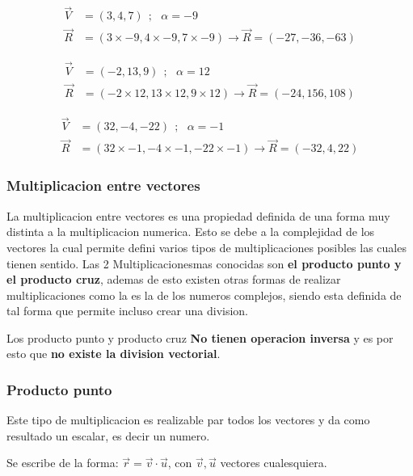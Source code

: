     \begin{align*}
        \vec{V}& =(3,4,7)  \ \ ;\ \ \  \alpha= -9	\\
        \vec{R}&= (3 \times-9,4 \times-9,7 \times-9  )  \rightarrow \vec{R}= (-27,-36,-63 )
    \end{align*}

    \begin{align*}
        \vec{V}& =(-2,13,9)  \ \ ;\ \ \  \alpha = 12 		\\
        \vec{R}&= (-2 \times12, 13 \times12, 9 \times12)  \rightarrow \vec{R}= (-24,156,108)
    \end{align*}

    \begin{align*}
        \vec{V}& =(32,-4,-22)  \ \ ;\ \ \  \alpha = -1		\\
        \vec{R}&= (32 \times-1, -4 \times-1, -22 \times-1 )  \rightarrow \vec{R}= (-32,4,22)
    \end{align*}




    \subsubsection{Multiplicacion entre vectores}

    La multiplicacion entre vectores es una propiedad definida de una forma
    muy distinta a la multiplicacion numerica. Esto se debe a la complejidad de
    los vectores la cual permite defini varios tipos de multiplicaciones posibles
    las cuales tienen sentido. Las 2 Multiplicacionesmas conocidas son \textbf{
    el producto punto y el producto cruz}, ademas de esto existen otras formas
    de realizar multiplicaciones como la es la de los numeros complejos, siendo
    esta definida de tal forma que permite incluso crear una division.

    Los producto punto y producto cruz \textbf{No tienen operacion inversa} y es
    por esto que \textbf{no existe la division vectorial}.

    \subsubsection{Producto punto}

    Este tipo de multiplicacion es realizable par todos los vectores y da como
    resultado un escalar, es decir un numero.

    Se escribe de la forma: $\vec{r} = \vec{v}\cdot\vec{u}$, con
    $\vec{v},\vec{u}$ vectores cualesquiera.

